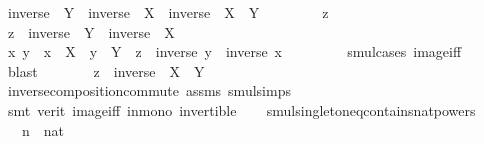 \begin{isabellebody}
\ {\isachardoublequoteopen}{\isacharparenleft}{\kern0pt}inverse\ {\isacharbackquote}{\kern0pt}\ Y{\isacharparenright}{\kern0pt}\ {\isasymcdots}\ {\isacharparenleft}{\kern0pt}inverse\ {\isacharbackquote}{\kern0pt}\ X{\isacharparenright}{\kern0pt}\ {\isasymsubseteq}\ inverse\ {\isacharbackquote}{\kern0pt}\ {\isacharparenleft}{\kern0pt}X\ {\isasymcdots}\ Y{\isacharparenright}{\kern0pt}{\isachardoublequoteclose}\isanewline
\ \ \isamarkupfalse%
\isanewline
\ \ \ \ \isamarkupfalse%
\ z\ \isamarkupfalse%
\ {\isachardoublequoteopen}z\ {\isasymin}\ {\isacharparenleft}{\kern0pt}inverse\ {\isacharbackquote}{\kern0pt}\ Y{\isacharparenright}{\kern0pt}\ {\isasymcdots}\ {\isacharparenleft}{\kern0pt}inverse\ {\isacharbackquote}{\kern0pt}\ X{\isacharparenright}{\kern0pt}{\isachardoublequoteclose}\isanewline
\ \ \ \ \isamarkupfalse%
\ \isamarkupfalse%
\ x\ y\ \ {\isachardoublequoteopen}x\ {\isasymin}\ X{\isachardoublequoteclose}\ \ {\isachardoublequoteopen}y\ {\isasymin}\ Y{\isachardoublequoteclose}\ \ {\isachardoublequoteopen}z\ {\isacharequal}{\kern0pt}\ inverse\ y\ {\isasymcdot}\ inverse\ x{\isachardoublequoteclose}\ \isanewline
\ \ \ \ \ \ \isamarkupfalse%
\ smul{\isachardot}{\kern0pt}cases\ image{\isacharunderscore}{\kern0pt}iff\ \isamarkupfalse%
\ blast\isanewline
\ \ \ \ \isamarkupfalse%
\ \isamarkupfalse%
\ {\isachardoublequoteopen}z\ {\isasymin}\ inverse\ {\isacharbackquote}{\kern0pt}\ {\isacharparenleft}{\kern0pt}X\ {\isasymcdots}\ Y{\isacharparenright}{\kern0pt}{\isachardoublequoteclose}\ \isamarkupfalse%
\ inverse{\isacharunderscore}{\kern0pt}composition{\isacharunderscore}{\kern0pt}commute\ assms\ smul{\isachardot}{\kern0pt}simps\isanewline
\ \ \ \ \ \ \isamarkupfalse%
\ {\isacharparenleft}{\kern0pt}smt\ {\isacharparenleft}{\kern0pt}verit{\isacharparenright}{\kern0pt}\ image{\isacharunderscore}{\kern0pt}iff\ in{\isacharunderscore}{\kern0pt}mono\ invertible{\isacharparenright}{\kern0pt}\isanewline
\ \ \isamarkupfalse%
\isanewline
{}\isamarkupfalse%
%
\endisatagproof
{\isafoldproof}%
%
\isadelimproof
\isanewline
%
\endisadelimproof
\isanewline
{}\isamarkupfalse%
\ smul{\isacharunderscore}{\kern0pt}singleton{\isacharunderscore}{\kern0pt}eq{\isacharunderscore}{\kern0pt}contains{\isacharunderscore}{\kern0pt}nat{\isacharunderscore}{\kern0pt}powers{\isacharcolon}{\kern0pt}\isanewline
\ \ \ n\ {\isacharcolon}{\kern0pt}{\isacharcolon}{\kern0pt}\ nat\isanewline

\end{isabellebody}
